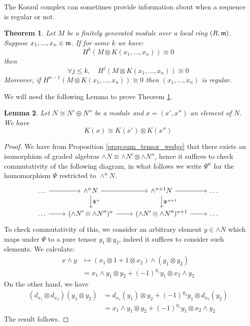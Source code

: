 \documentclass[12pt]{article}
\theoremstyle{plain}
\newtheorem{thm}{Theorem}[subsection] %
\newtheorem{lemma}[thm]{Lemma}
\theoremstyle{definition}
\begin{document}
The Koszul complex can sometimes provide information about when a sequence is regular or not.
\begin{thm}\label{thm:exact_reg}
	Let $M$ be a finitely generated module over a local ring $(R,\frak{m})$. Suppose $x_1,...,x_n \in \frak{m}$. If for some $k$ we have:
	\begin{equation}
		H^k(M \otimes K(x_1,...,x_n)) \cong 0
	\end{equation}
	then
	\begin{equation}
		\forall j \leq k,\quad H^j(M \otimes K(x_1,...,x_n)) \cong 0
	\end{equation}
	Moreover, if $H^{n-1}(M \otimes K(x_1,...,x_n)) \cong 0$ then $(x_1,...,x_n)$ is regular.
\end{thm}
We will need the following Lemma to prove Theorem \ref{thm:exact_reg}.
\begin{lemma}\label{lem:sum_tens}
	Let $N \cong N' \oplus N''$ be a module and $x = (x',x'')$ an element of $N$. We have
	\begin{equation}
		K(x) \cong K(x') \otimes K(x'')
	\end{equation}
\end{lemma}
\begin{proof}
	We have from Proposition \ref{prop:sum_tensor_wedge} that there exists an isomorphism of graded algebras $\wedge N \cong \wedge N' \otimes \wedge N''$, hence it suffices to check commutativity of the following diagram, in what follows we write $\Psi^n$ for the homomorphism $\Psi$ restricted to $\wedge^n N$.
	\begin{equation}
		\begin{tikzcd}
			\hdots\arrow[r] & \wedge^n N\arrow[r]\arrow[d,"{\Psi^n}"] & \wedge^{n+1} N\arrow[r]\arrow[d,"{\Psi^{n+1}}"] & \hdots\\
			\hdots\arrow[r] & (\wedge N' \otimes \wedge N'')^{n}\arrow[r] & (\wedge N' \otimes \wedge N'')^{n+1}\arrow[r] & \hdots 
		\end{tikzcd}
	\end{equation}
	To check commutativity of this, we consider an arbitrary element $y \in \wedge N$ which maps under $\Psi$ to a pure tensor $y_1 \otimes y_2$, indeed it suffices to consider such elements. We calculate:
	\begin{align*}
		x \wedge y &\longmapsto (x_1 \otimes 1 + 1 \otimes x_2) \wedge (y_1 \otimes y_2)\\
		&= x_1 \wedge y_1 \otimes y_2 + (-1)^{y_1}y_1 \otimes x_2 \wedge y_2
	\end{align*}
	On the other hand, we have
	\begin{align*}
		(d_{x_1} \otimes d_{x_2})(y_1 \otimes y_2) &= d_{x_1}(y_1) \otimes y_2 + (-1)^{y_2}y_1 \otimes d_{x_2}(y_2)\\
		&= x_1 \wedge y_1 \otimes y_2 + (-1)^{y_1}y_1 \otimes x_2 \wedge y_2
	\end{align*}
	The result follows.
\end{proof}
\end{document}
